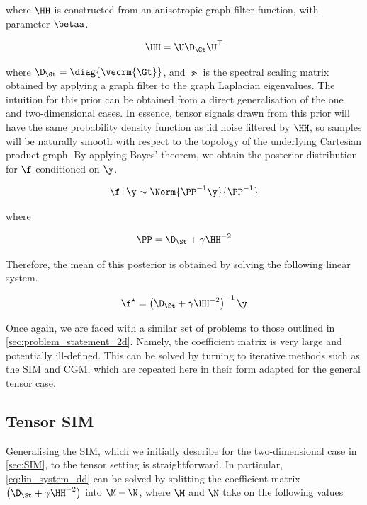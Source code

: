 where $\HH$ is constructed from an anisotropic graph filter function, with parameter $\betaa$. 

\begin{equation*}
    \HH = \U \D_\Gt \U^\top
\end{equation*}

where $\D_\Gt = \diag{\vecrm{\Gt}}$, and $\Gt$ is the spectral scaling matrix obtained by applying a graph filter to the graph Laplacian eigenvalues. The intuition for this prior can be obtained from a direct generalisation of the one and two-dimensional cases. In essence, tensor signals drawn from this prior will have the same probability density function as iid noise filtered by $\HH$, so samples will be naturally smooth with respect to the topology of the underlying Cartesian product graph. By applying Bayes' theorem, we obtain the posterior distribution for $\f$ conditioned on $\y$. 


\begin{equation}
    \f \, | \, \y \sim \Norm{\PP^{-1} \y}{\PP^{-1}}
\end{equation}

where 

\begin{equation}
    \PP = \D_{\St} + \gamma \HH^{-2}
\end{equation}

Therefore, the mean of this posterior is obtained by solving the following linear system.

\begin{equation}
    \label{eq:lin_system_dd}
    \f^{\star} = \left(\D_\St + \gamma \HH^{-2}\right)^{-1} \y
\end{equation}

Once again, we are faced with a similar set of problems to those outlined in \cref{sec:problem_statement_2d}. Namely, the coefficient matrix is very large and potentially ill-defined. This can be solved by turning to iterative methods such as the SIM and CGM, which are repeated here in their form adapted for the general tensor case. 

\subsection{Tensor SIM}

\label{sec:SIM_dd}

Generalising the SIM, which we initially describe for the two-dimensional case in \cref{sec:SIM}, to the tensor setting is straightforward. In particular, \cref{eq:lin_system_dd} can be solved by splitting the coefficient matrix $\left(\D_\St + \gamma \HH^{-2}\right)$ into $\M - \N$, where $\M$ and $\N$ take on the following values
 
